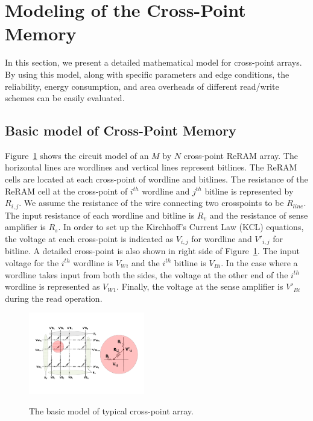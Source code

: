 \vspace{10pt}
\section{Modeling of the Cross-Point Memory}\label{sec:model}

In this section, we present a detailed mathematical model for cross-point arrays. By using this model, along with specific parameters and
edge conditions, the reliability, energy consumption, and area overheads of different read/write schemes can be easily evaluated.

\subsection{Basic model of Cross-Point Memory}
Figure~\ref{fig:modeling} shows the circuit model of an $M$ by $N$ cross-point ReRAM array. The horizontal lines are wordlines and vertical lines represent bitlines. The ReRAM cells are located at each cross-point of wordline and bitlines. The resistance of the ReRAM cell at the cross-point of $i^{th}$ wordline and $j^{th}$ bitline is represented by $R_{i,j}$. We assume the resistance of the wire connecting two crosspoints to be $R_{line}$. The input resistance of each wordline and bitline is $R_v$ and the resistance of sense amplifier is $R_s$. In order to set up the Kirchhoff's Current Law (KCL) equations, the voltage at each cross-point is indicated as $V_{i,j}$ for wordline and $V'_{i,j}$ for bitline. A detailed cross-point is also shown in right side of Figure~\ref{fig:modeling}. The input voltage for the $i^{th}$ wordline is $V_{Wi}$ and the $i^{th}$ bitline is $V_{Bi}$. In the case where a wordline takes input from both the sides, the voltage at the other end of the $i^{th}$ wordline is represented as $V_{W1}$. Finally, the voltage at the sense amplifier is $V'_{Bi}$ during the read operation.

\begin{figure}%
\centering
  \includegraphics[width=0.45\textwidth]{./figures/model_reverse.pdf}\\
  \caption{The basic model of typical cross-point array.}\label{fig:modeling}
  \vspace{-12pt}
\end{figure}

